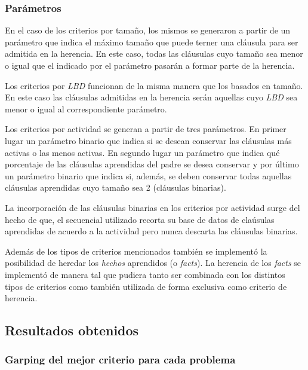 \subsubsection{Parámetros}

En el caso de los criterios por tamaño, los mismos se generaron a partir de un
parámetro que indica el máximo tamaño que puede terner una cláusula para ser
admitida en la herencia. En este caso, todas las cláusulas cuyo tamaño sea
menor o igual que el indicado por el parámetro pasarán a formar parte de la
herencia.

Los criterios por \emph{LBD} funcionan de la misma manera que los basados en
tamaño. En este caso las cláusulas admitidas en la herencia serán aquellas
cuyo \emph{LBD} sea menor o igual al correspondiente parámetro.

Los criterios por actividad se generan a partir de tres parámetros. En primer
lugar un parámetro binario que indica si se desean conservar las cláusulas más
activas o las menos activas. En segundo lugar un parámetro que indica qué
porcentaje de las cláusulas aprendidas del padre se desea conservar y por
último un parámetro binario que indica si, además, se deben conservar todas
aquellas cláusulas aprendidas cuyo tamaño sea 2 (cláusulas binarias).

La incorporación de las cláusulas binarias en los criterios por actividad
surge del hecho de que, el \ssolver secuencial utilizado recorta su base de
datos de claúsulas aprendidas de acuerdo a la actividad pero nunca descarta
las cláusulas binarias.

Además de los tipos de criterios mencionados también se implementó la
posibilidad de heredar los \emph{hechos} aprendidos (o \emph{facts}). La
herencia de los \emph{facts} se implementó de manera tal que pudiera tanto ser
combinada con los distintos tipos de criterios como también utilizada de forma
exclusiva como criterio de herencia.




\subsection{Resultados obtenidos}

\subsubsection{Garping del mejor criterio para cada problema}


